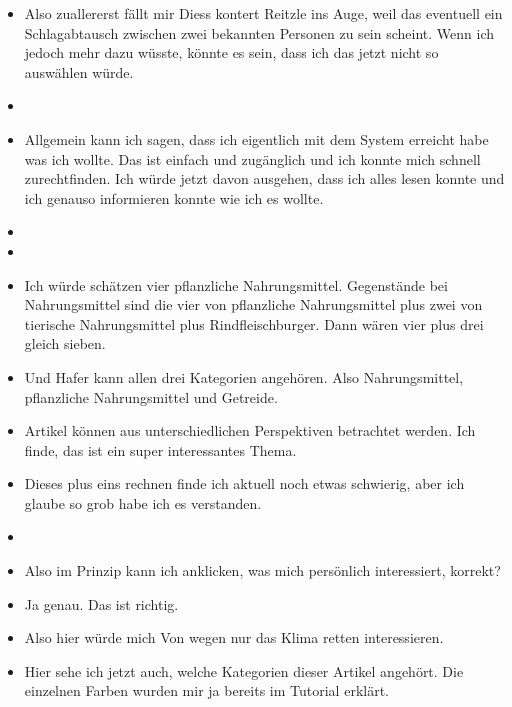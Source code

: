 {\begin{itemize}[]
            \item {} Also zuallererst fällt mir \flqq Diess kontert Reitzle\frqq{} ins Auge, weil das eventuell ein Schlagabtausch zwischen zwei bekannten Personen zu sein scheint.
                  Wenn ich jedoch mehr dazu wüsste, könnte es sein, dass ich das jetzt nicht so auswählen würde.
            \item {}
            \item {} Allgemein kann ich sagen, dass ich eigentlich mit dem System erreicht habe was ich wollte.
                  Das ist einfach und zugänglich und ich konnte mich schnell zurechtfinden.
                  Ich würde jetzt davon ausgehen, dass ich alles lesen konnte und ich genauso informieren konnte wie ich es wollte.
            \item {}
            \item {}
            \item {} Ich würde schätzen vier pflanzliche Nahrungsmittel.
                  Gegenstände bei Nahrungsmittel sind die vier von pflanzliche Nahrungsmittel plus zwei von tierische Nahrungsmittel plus Rindfleischburger.
                  Dann wären vier plus drei gleich sieben.
            \item {} Und Hafer kann allen drei Kategorien angehören. Also Nahrungsmittel, pflanzliche Nahrungsmittel und Getreide.
            \item {} Artikel können aus unterschiedlichen Perspektiven betrachtet werden. Ich finde, das ist ein super interessantes Thema.
            \item {} Dieses plus eins rechnen finde ich aktuell noch etwas schwierig, aber ich glaube so grob habe ich es verstanden.
            \item {}
            \item {} Also im Prinzip kann ich anklicken, was mich persönlich interessiert, korrekt?
            \item {} Ja genau. Das ist richtig.
            \item {} Also hier würde mich \flqq Von wegen nur das Klima retten\frqq{} interessieren.
            \item {} Hier sehe ich jetzt auch, welche Kategorien dieser Artikel angehört.
                  Die einzelnen Farben wurden mir ja bereits im Tutorial erklärt.

\end{itemize}}

